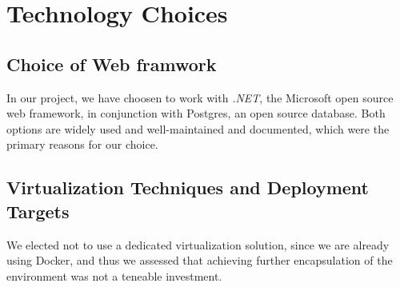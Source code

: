 
\section{Technology Choices}

\subsection{Choice of Web framwork}
In our project, we have choosen to work with \textit{.NET}, the Microsoft open source web framework, in conjunction with Postgres, an open source database.
Both options are widely used and well-maintained and documented, which were the primary reasons for our choice.




\subsection{Virtualization Techniques and Deployment Targets}

We elected not to use a dedicated virtualization solution,
since we are already using Docker, and thus we assessed that achieving further encapsulation of the environment was not a teneable investment.

